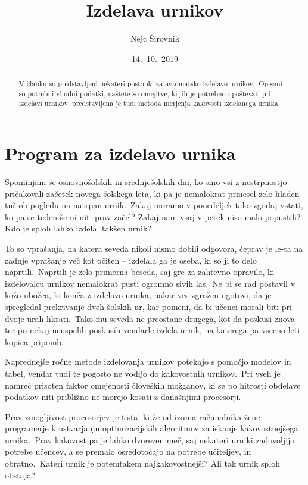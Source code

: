 \documentclass[a4paper]{article}
\begin{document}

\title{Izdelava urnikov}
\author{Nejc Širovnik}
\date{14.\ 10.\ 2019}
\maketitle

\begin{abstract}
V članku so predstavljeni nekateri postopki za avtomatsko izdelavo urnikov.\ Opisani so
potrebni vhodni podatki, naštete so omejitve, ki jih je potrebno upoštevati pri izdelavi
urnikov, predstavljena je tudi metoda merjenja kakovosti izdelanega urnika.
\end{abstract}

\section{Program za izdelavo urnika} %

Spominjam se osnovnošolskih in srednješolskih dni, ko smo vsi z nestrpnostjo pričakovali
začetek novega šolskega leta, ki pa je nemalokrat prinesel zelo hladen tuš ob pogledu na
natrpan urnik.\ Zakaj moramo v ponedeljek tako zgodaj vstati, ko pa se teden še ni niti
prav začel? Zakaj nam vsaj v petek niso malo popustili? Kdo je sploh lahko izdelal
takšen urnik?

To so vprašanja, na katera seveda nikoli nismo dobili odgovora, čeprav je le-ta na zadnje
vprašanje več kot očiten -- izdelala ga je oseba, ki so ji to delo naprtili.\ Naprtili je
zelo primerna beseda, saj gre za zahtevno opravilo, ki izdelovalcu urnikov nemalokrat
pusti ogromno sivih las.\ Ne bi se rad postavil v kožo ubožca, ki konča z izdelavo urnika,
nakar ves zgrožen ugotovi, da je spregledal prekrivanje dveh šolskih ur, kar pomeni, da
bi učenci morali biti pri dvoje urah hkrati.\ Tako mu seveda ne preostane drugega, kot da
poskusi znova ter po nekaj neuspelih poskusih vendarle izdela urnik, na katerega pa vseeno
leti kopica pripomb.

Naprednejše ročne metode izdelovanja urnikov potekajo s pomočjo modelov in tabel, vendar
tudi te pogosto ne vodijo do kakovostnih urnikov.\ Pri vseh je namreč prisoten faktor
omejenosti človeških možganov, ki se po hitrosti obdelave podatkov niti približno ne
morejo kosati z današnjimi procesorji.

Prav zmogljivost procesorjev je tista, ki že od izuma računalnika žene programerje k
ustvarjanju optimizacijskih algoritmov za iskanje kakovostnejšega urnika.\ Prav kakovost
pa je lahko dvorezen meč, saj nekateri urniki zadovoljijo potrebe učencev, a se premalo
osredotočajo na potrebe učiteljev, in obratno.\ Kateri urnik je potemtakem najkakovostnejši?
Ali tak urnik sploh obstaja?
\end{document}
